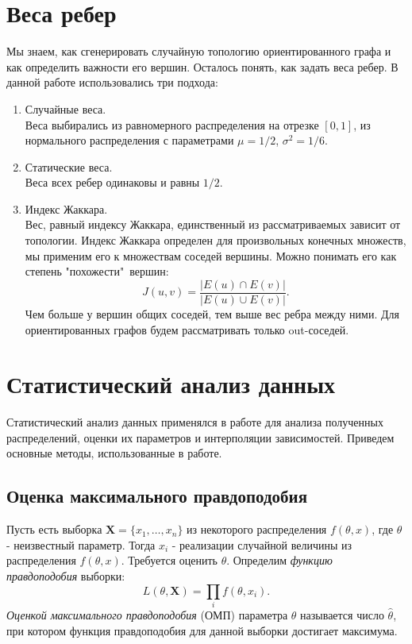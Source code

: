 \section{Веса ребер}
Мы знаем, как сгенерировать случайную топологию ориентированного графа и как определить важности его вершин. Осталось понять, как задать веса ребер. В данной работе использовались три подхода:

\begin{enumerate}
	\item Случайные веса.\\
	Веса выбирались из равномерного распределения на отрезке $[0,1]$, из нормального распределения с параметрами $\mu=1/2$, $\sigma^2=1/6$.
	\item Статические веса.\\
	Веса всех ребер одинаковы и равны $1/2$.
	\item Индекс Жаккара.\\
	Вес, равный индексу Жаккара, единственный из рассматриваемых зависит от топологии. Индекс Жаккара определен для произвольных конечных множеств, мы применим его к множествам соседей вершины. Можно понимать его как степень "похожести"\ вершин:
	\begin{equation}
	J(u,v)=\frac{|E(u)\cap E(v)|}{|E(u)\cup E(v)|}.
	\end{equation}
	Чем больше у вершин общих соседей, тем выше вес ребра между ними. Для ориентированных графов будем рассматривать только out-соседей.
\end{enumerate}

\section{Статистический анализ данных}
Статистический анализ данных применялся в работе для анализа полученных распределений, оценки их параметров и интерполяции зависимостей. Приведем основные методы, использованные в работе.

\subsection{Оценка максимального правдоподобия}
Пусть есть выборка $\mathbf{X}=\{x_1,\dots, x_n\}$ из некоторого распределения $f(\theta, x)$, где $\theta$ - неизвестный параметр. Тогда $x_i$ - реализации случайной величины из распределения $f(\theta, x)$. Требуется оценить $\theta$. Определим \textit{функцию правдоподобия} выборки:
\begin{equation}
L(\theta, \mathbf{X})=\prod_{i} f(\theta, x_i). 
\end{equation}
\textit{Оценкой максимального правдоподобия} (ОМП) параметра $\theta$ называется число $\hat{\theta}$, при котором функция правдоподобия для данной выборки достигает максимума.\\

